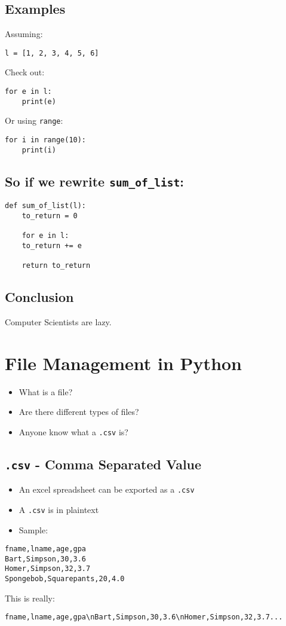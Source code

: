 \documentclass[11pt]{article}
\begin{document}
\subsection{Examples}
\label{sec:org7f960b4}
Assuming:
\begin{verbatim}
l = [1, 2, 3, 4, 5, 6]
\end{verbatim}
Check out:
\begin{verbatim}
for e in l:
    print(e)
\end{verbatim}
Or using \texttt{range}:
\begin{verbatim}
for i in range(10):
    print(i)
\end{verbatim}
\subsection{So if we rewrite \texttt{sum\_of\_list}:}
\label{sec:orgcdbf7bd}
\begin{verbatim}
def sum_of_list(l):
    to_return = 0

    for e in l:
	to_return += e

    return to_return
\end{verbatim}
\subsection{Conclusion}
\label{sec:org340547b}
Computer Scientists are lazy.
\section{File Management in Python}
\label{sec:org10f6511}
\begin{itemize}
\item What is a file?
\item Are there different types of files?
\item Anyone know what a \texttt{.csv} is?
\end{itemize}
\subsection{\texttt{.csv} - Comma Separated Value}
\label{sec:org557d2ba}
\begin{itemize}
\item An excel spreadsheet can be exported as a \texttt{.csv}
\item A \texttt{.csv} is in plaintext
\item Sample:
\end{itemize}
\begin{verbatim}
fname,lname,age,gpa
Bart,Simpson,30,3.6
Homer,Simpson,32,3.7
Spongebob,Squarepants,20,4.0
\end{verbatim}
This is really:
\begin{verbatim}
fname,lname,age,gpa\nBart,Simpson,30,3.6\nHomer,Simpson,32,3.7...
\end{verbatim}
\end{document}
